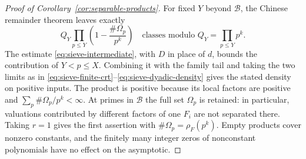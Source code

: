 \begin{proof}[Proof of Corollary~\ref{cor:separable-products}]
For fixed $Y$ beyond $\mathcal B$, the Chinese remainder theorem leaves
exactly
\[
 Q_Y\prod_{p\le Y}\left(1-\frac{\#\Omega_p}{p^k}\right)
 \quad\text{classes modulo }Q_Y=\prod_{p\le Y}p^k.
\]
The estimate \eqref{eq:sieve-intermediate}, with $D$ in place of $d$,
bounds the contribution of $Y<p\le X$. Combining it with the family
tail and taking the two limits as in
\eqref{eq:sieve-finite-crt}--\eqref{eq:sieve-dyadic-density} gives the
stated density on positive inputs. The product is positive because its
local factors are positive and $\sum_p\#\Omega_p/p^k<\infty$.
At primes in $\mathcal B$ the full set $\Omega_p$ is retained: in
particular, valuations contributed by different factors of one $F_i$
are not separated there. Taking $r=1$ gives the first assertion with
$\#\Omega_p=\rho_F(p^k)$. Empty products cover nonzero constants, and
the finitely many integer zeros of nonconstant polynomials have no
effect on the asymptotic.
\end{proof}

